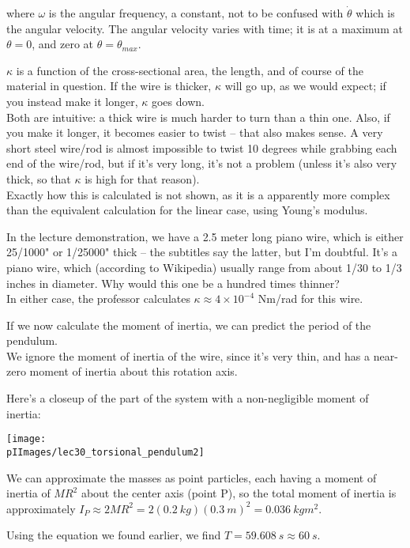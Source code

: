 where $\omega$ is the angular frequency, a constant, not to be confused with $\dot{\theta}$ which is the angular velocity. The angular velocity varies with time; it is at a maximum at $\theta = 0$, and zero at $\theta = \theta_{max}$.

$\kappa$ is a function of the cross-sectional area, the length, and of course of the material in question. If the wire is thicker, $\kappa$ will go up, as we would expect; if you instead make it longer, $\kappa$ goes down.\\
Both are intuitive: a thick wire is much harder to turn than a thin one. Also, if you make it longer, it becomes easier to twist -- that also makes sense. A very short steel wire/rod is almost impossible to twist 10 degrees while grabbing each end of the wire/rod, but if it's very long, it's not a problem (unless it's also very thick, so that $\kappa$ is high for that reason).\\
Exactly how this is calculated is not shown, as it is a apparently more complex than the equivalent calculation for the linear case, using Young's modulus.

In the lecture demonstration, we have a 2.5 meter long piano wire, which is either 25/1000" or 1/25000" thick -- the subtitles say the latter, but I'm doubtful. It's a piano wire, which (according to Wikipedia) usually range from about 1/30 to 1/3 inches in diameter. Why would this one be a hundred times thinner?\\
In either case, the professor calculates $\kappa \approx 4 \times 10^{-4}$ Nm/rad for this wire.

If we now calculate the moment of inertia, we can predict the period of the pendulum.\\
We ignore the moment of inertia of the wire, since it's very thin, and has a near-zero moment of inertia about this rotation axis.

Here's a closeup of the part of the system with a non-negligible moment of inertia:

\begin{center}
\texttt{[image: \\pIImages/lec30\_torsional\_pendulum2]}
\end{center}

We can approximate the masses as point particles, each having a moment of inertia of $M R^2$ about the center axis (point P), so the total moment of inertia is approximately $I_P \approx 2 M R^2 = 2(\SI{0.2}{kg})(\SI{0.3}{m})^2 = \SI{0.036}{kg m^2}$.

Using the equation we found earlier, we find $T = \SI{59.608}{s} \approx \SI{60}{s}$.

